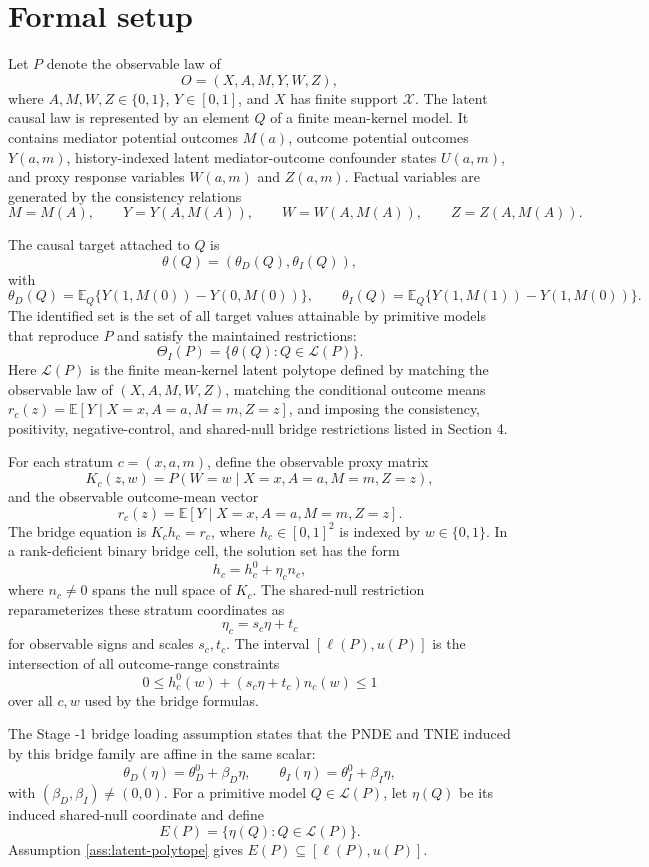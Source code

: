 \documentclass[11pt]{article}
\newcommand{\E}{\mathbb{E}}
\theoremstyle{definition}
\theoremstyle{plain}
\theoremstyle{remark}
\begin{document}
\section{Formal setup}
Let \(P\) denote the observable law of
\[
  O=(X,A,M,Y,W,Z),
\]
where \(A,M,W,Z\in\{0,1\}\), \(Y\in[0,1]\), and \(X\) has finite support
\(\mathcal X\).  The latent causal law is represented by an element
\(Q\) of a finite mean-kernel model.  It contains mediator potential outcomes
\(M(a)\), outcome potential outcomes \(Y(a,m)\), history-indexed latent
mediator-outcome confounder states \(U(a,m)\), and proxy response variables
\(W(a,m)\) and \(Z(a,m)\).  Factual variables are generated by the consistency
relations
\[
  M=M(A),\qquad Y=Y(A,M(A)),\qquad
  W=W(A,M(A)),\qquad Z=Z(A,M(A)).
\]

The causal target attached to \(Q\) is
\[
  \theta(Q)=(\theta_D(Q),\theta_I(Q)),
\]
with
\[
  \theta_D(Q)=\E_Q\{Y(1,M(0))-Y(0,M(0))\},
  \qquad
  \theta_I(Q)=\E_Q\{Y(1,M(1))-Y(1,M(0))\}.
\]
The identified set is the set of all target values attainable by primitive
models that reproduce \(P\) and satisfy the maintained restrictions:
\[
  \Theta_I(P)=\{\theta(Q):Q\in\mathcal L(P)\}.
\]
Here \(\mathcal L(P)\) is the finite mean-kernel latent polytope defined by
matching the observable law of \((X,A,M,W,Z)\), matching the conditional
outcome means \(r_c(z)=\E[Y\mid X=x,A=a,M=m,Z=z]\), and imposing the
consistency, positivity, negative-control, and shared-null bridge restrictions
listed in Section 4.

For each stratum \(c=(x,a,m)\), define the observable proxy matrix
\[
  K_c(z,w)=P(W=w\mid X=x,A=a,M=m,Z=z),
\]
and the observable outcome-mean vector
\[
  r_c(z)=\E[Y\mid X=x,A=a,M=m,Z=z].
\]
The bridge equation is \(K_ch_c=r_c\), where \(h_c\in[0,1]^2\) is indexed by
\(w\in\{0,1\}\).  In a rank-deficient binary bridge cell, the solution set has
the form
\[
  h_c=h_c^0+\eta_c n_c,
\]
where \(n_c\ne0\) spans the null space of \(K_c\).  The shared-null restriction
reparameterizes these stratum coordinates as
\[
  \eta_c=s_c\eta+t_c
\]
for observable signs and scales \(s_c,t_c\).  The interval
\([\ell(P),u(P)]\) is the intersection of all outcome-range constraints
\[
  0\le h_c^0(w)+(s_c\eta+t_c)n_c(w)\le1
\]
over all \(c,w\) used by the bridge formulas.

The Stage -1 bridge loading assumption states that the PNDE and TNIE induced by
this bridge family are affine in the same scalar:
\[
  \theta_D(\eta)=\theta_D^0+\beta_D\eta,\qquad
  \theta_I(\eta)=\theta_I^0+\beta_I\eta,
\]
with \((\beta_D,\beta_I)\ne(0,0)\).  For a primitive model
\(Q\in\mathcal L(P)\), let \(\eta(Q)\) be its induced shared-null coordinate
and define
\[
  E(P)=\{\eta(Q):Q\in\mathcal L(P)\}.
\]
Assumption \ref{ass:latent-polytope} gives \(E(P)\subseteq[\ell(P),u(P)]\).
\end{document}
